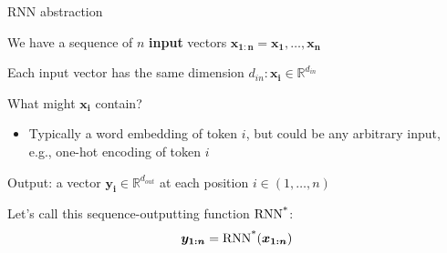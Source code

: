 \documentclass[12pt,aspectratio=169,handout]{beamer}
\begin{document}
\begin{frame}{RNN abstraction}

We have a sequence of $n$ \textbf{input} vectors $\bm{x_{1:n}} = \bm{x_1}, \ldots, \bm{x_n}$

Each input vector has the same dimension $d_{in}: \bm{x_i} \in \mathbb{R}^{d_{in}}$

\bigskip

What might $\bm{x_i}$ contain?
\begin{itemize}
	\item Typically a word embedding of token $i$, but could be any arbitrary input, e.g., one-hot encoding of token $i$
\end{itemize}
\bigskip

\pause

Output: a vector $\bm{y_i} \in \mathbb{R}^{d_{out}}$ at each position $i \in (1, \ldots, n)$

Let's call this sequence-outputting function $\operatorname*{RNN^{*}}$:
$$
\bm{y_{1:n}} = \operatorname*{RNN^{*}} (\bm{x_{1:n}})
$$

\end{frame}
\end{document}
